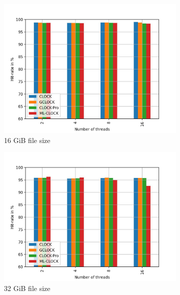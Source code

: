 \documentclass[
	12pt,
	a4paper,
	abstract,
	bibliography=totoc,
	chapterprefix,
	headings=openright,
	numbers=endperiod,
	parskip=half,
	twoside,
]{scrreprt}
\begin{document}
\begin{figure}[H]
	\centering
	\begin{subfigure}{0.4\textwidth}
		\includegraphics[width=\textwidth]{multi_16_gb_rw_90to10_uniform.jpg}		
		\caption{16 GiB file size}
		\label{fig:rw_90to10  zipf}
	\end{subfigure}
	\hfill
	\begin{subfigure}{0.4\textwidth}
		\includegraphics[width=\textwidth]{multi_32_gb_rw_90to10_uniform.jpg}		
		\caption{32 GiB file size}
		\label{fig:rw_90to10  normal}
	\end{subfigure}
	\hfill
	\begin{subfigure}{0.4\textwidth}

\end{subfigure}
\end{figure}
\end{document}
